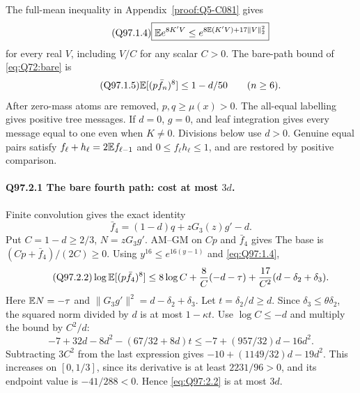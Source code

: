 The full-mean inequality in Appendix~\ref{proof:Q5-C081} gives
\begin{equation}\tag{Q97.1.4}\label{eq:Q97:1.4}
\boxed{\mathbb E e^{8K'V}\le e^{8\mathbb E(K'V)+17\|V\|_2^2}}
\end{equation}
for every real \(V\), including \(V/C\) for any scalar \(C>\allowbreak 0\).
The bare-path bound of \eqref{eq:Q72:bare} is
\begin{equation}\tag{Q97.1.5}\label{eq:Q97:1.5}
\mathbb E[(p\bar f_n)^8]\le1-d/50\qquad(n\ge6).
\end{equation}
After zero-mass atoms are removed, \(p,\allowbreak q\ge\allowbreak \mu(x)>\allowbreak 0\).
The all-equal labelling gives positive tree messages. If \(d=\allowbreak 0\),
\(g=\allowbreak 0\), and leaf integration gives every message equal to one even
when \(K\ne0\). Divisions below use \(d>\allowbreak 0\).
Genuine equal pairs satisfy \(f_\ell+h_\ell=\allowbreak 2\mathbb E f_{\ell-1}\) and
\(0\le\allowbreak  f_\ell h_\ell\le\allowbreak 1\), and are restored by positive comparison.

\paragraph{Q97.2.1 The bare fourth path: cost at most \(3d\).}
Finite convolution gives the exact identity
\begin{equation}\tag{Q97.2.1}\label{eq:Q97:2.1}
\bar f_4=(1-d)q+zG_3(z)g'-d.
\end{equation}
Put \(C=\allowbreak 1-d\ge\allowbreak 2/3\), \(N=\allowbreak zG_3g'\). AM--GM on \(Cp\) and
\(\bar f_4\) gives
The base is \((Cp+\bar f_4)/(2C)\ge\allowbreak 0\).
Using \(y^{16}\le\allowbreak  e^{16(y-1)}\) and \eqref{eq:Q97:1.4},
\begin{equation}\tag{Q97.2.2}\label{eq:Q97:2.2}
\log\mathbb E[(p\bar f_4)^8]\le8\log C+\frac8C(-d-\tau)
+\frac{17}{C^2}(d-\delta_2+\delta_3).
\end{equation}
Here \(\mathbb E N=\allowbreak -\tau\) and \(\|G_3g'\|^2=\allowbreak d-\delta_2+\delta_3\).
Let \(t=\allowbreak \delta_2/d\ge\allowbreak  d\). Since \(\delta_3\le\allowbreak \theta\delta_2\),
the squared norm divided by \(d\) is at most \(1-\kappa t\).
Use \(\log C\le\allowbreak -d\) and multiply the bound by \(C^2/d\):
\begin{equation}\tag{Q97.2.3}\label{eq:Q97:2.3}
-7+32d-8d^2-(67/32+8d)t\le-7+(957/32)d-16d^2.
\end{equation}
Subtracting \(3C^2\) from the last expression gives
\(-10+(1149/32)d-19d^2\). This increases on \([0,\allowbreak 1/3]\), since its
derivative is at least \(2231/96>\allowbreak 0\), and its endpoint value is
\(-41/288<\allowbreak 0\). Hence \eqref{eq:Q97:2.2} is at most \(3d\).

